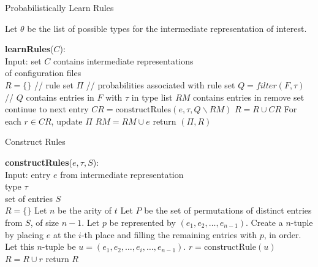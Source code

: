 \begin{algorithm}
\caption{Probabilistically Learn Rules}
\label{alg:plearn}
  Let $\theta$ be the list of possible types for the intermediate representation of interest.
  \begin{algorithmic}[1]
  \State \textbf{learnRules}($C$):\\

  Input: set $C$ contains intermediate representations\\ 
     \qquad \enspace \enspace of configuration files\\

    \State $R = \{\}$ // rule set
    \State $\Pi$ // probabilities associated with rule set
        \State $Q = filter(F,\tau)$ 
        \State // $Q$ contains entries in $F$ with $\tau$ in type list
        \State $RM$ contains entries in remove set
                        \State continue to next entry
                        \Else \enspace $CR = \textrm{constructRules}(e, \tau, Q \backslash RM)$
                        \State $R = R  \cup CR$
                        \State For each $r \in CR$, update $\Pi$ 
               \EndIf
               \State $RM = RM \cup e$
        \EndFor
     \EndFor
    \EndFor
    \State return $(\Pi,R)$
  \end{algorithmic}
\end{algorithm}


\begin{algorithm}
\caption{Construct Rules}
\label{alg:crules}
  \begin{algorithmic}[1]
  \State \textbf{constructRules}($e, \tau, S$):\\
    Input: entry $e$ from intermediate representation\\ 
     \qquad \enspace \enspace type $\tau$\\
     \qquad \enspace \enspace set of entries $S$\\
     $R = \{\}$
        \State Let $n$ be the arity of $t$
        \State Let $P$ be the set of permutations of distinct entries from $S$, of size $n-1$. 
         \State Let $p$ be represented by $(e_1, e_2, \ldots, e_{n-1})$.
           \State Create a $n$-tuple by placing $e$ at the $i$-th place and filling the remaining entries with $p$, in order. Let this $n$-tuple be $u = (e_1, e_2, \ldots, e_i, \ldots, e_{n-1})$.
           \State $r = \textrm{constructRule}(u)$ 
              $R = R \cup r$
            \EndIf
          \EndFor
        \EndFor
     \EndFor
     \State return $R$
  \end{algorithmic}
\end{algorithm}

